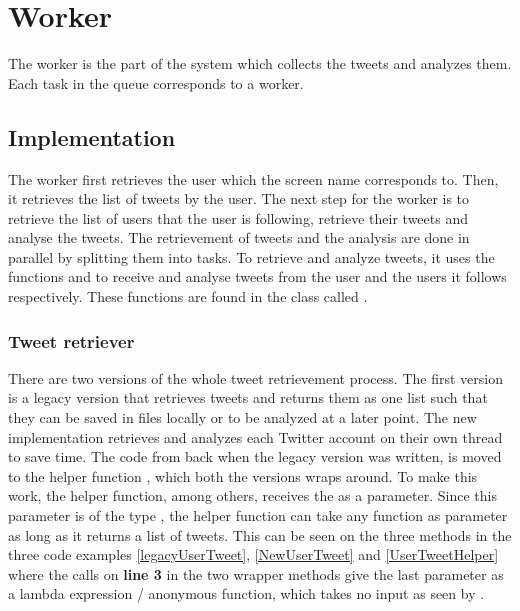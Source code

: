\chapter{Worker}\label{workerLabel}
The worker is the part of the system which collects the tweets and analyzes
them. Each task in the queue corresponds to a worker. 

\section{Implementation}
The worker first retrieves the user which the screen name corresponds to. Then,
it retrieves the list of tweets by the user. The next step for the
worker is to retrieve the list of users that the user is following, retrieve
their tweets and analyse the tweets. The retrievement of tweets and the
analysis are done in parallel by splitting them into tasks. To retrieve and
analyze tweets, it uses the functions  and
 to receive and analyse tweets from the
user and the users it follows respectively. These functions are found in the
class called .

\subsection{Tweet retriever} \label{sub:tweetretriever}
There are two versions of the whole tweet retrievement process. The first
version is a legacy version that retrieves tweets and returns them as one list
such that they can be saved in files locally or to be analyzed at a later
point.
The new implementation retrieves and analyzes each Twitter account on their own
thread to save time. The code from back when the legacy version was written, is moved to the helper function
, which both the versions wraps around. To make
this work, the helper function, among others, receives the  as
a parameter. Since this parameter is of the type , the
helper function can take any function as parameter as long as it returns a list
of tweets.
This can be seen on the three methods in the three code examples
\autoref{legacyUserTweet}, \autoref{NewUserTweet} and
\autoref{UserTweetHelper} where the calls on \textbf{line 3} in the two
wrapper methods give the last parameter as a lambda expression / anonymous
function, which takes no input as seen by \textc{() =>}.\\

